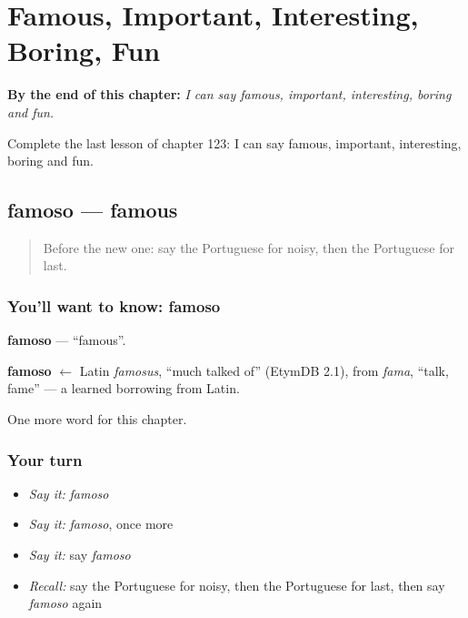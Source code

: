 
\chapter{Famous, Important, Interesting, Boring, Fun}
\label{ch:pt-famous-important-interesting-boring-fun}

\begin{chapteropening}
\textbf{By the end of this chapter:} \emph{I can say famous, important, interesting, boring and fun.}

Complete the last lesson of chapter 123: I can say famous, important, interesting, boring and fun.
\end{chapteropening}

\section[famoso]{famoso — famous}

\label{lesson:PT-C123-famoso}



\begin{quote}
Before the new one: say the Portuguese for noisy, then the Portuguese for last.
\end{quote}

\subsection*{You'll want to know: famoso}
\textbf{famoso} — \textquotedblleft{}famous\textquotedblright{}.

\begin{cousinweb}
\textbf{famoso} $\leftarrow$ Latin \emph{famosus}, \textquotedblleft{}much talked of\textquotedblright{} (EtymDB 2.1), from \emph{fama}, \textquotedblleft{}talk, fame\textquotedblright{} — a learned borrowing from Latin.
\end{cousinweb}

\begin{grammarlens}[title={What you've built}]
One more word for this chapter.
\end{grammarlens}

\subsection*{Your turn}
\begin{itemize}
\raggedright
  \item \emph{Say it:} \emph{famoso}
  \item \emph{Say it:} \emph{famoso}, once more
  \item \emph{Say it:} say \emph{famoso}
  \item \emph{Recall:} say the Portuguese for noisy, then the Portuguese for last, then say \emph{famoso} again
\end{itemize}

